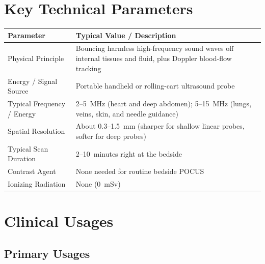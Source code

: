 \section{Key Technical Parameters}

\noindent
\begin{tabularx}{\textwidth}{@{}l X@{}}
\toprule
\textbf{Parameter} & \textbf{Typical Value / Description} \\
\midrule
Physical Principle & Bouncing harmless high-frequency sound waves off internal tissues and fluid, plus Doppler blood-flow tracking \\
Energy / Signal Source & Portable handheld or rolling-cart ultrasound probe \\
Typical Frequency / Energy & 2--5~MHz (heart and deep abdomen); 5--15~MHz (lungs, veins, skin, and needle guidance) \\
Spatial Resolution & About 0.3--1.5~mm (sharper for shallow linear probes, softer for deep probes) \\
Typical Scan Duration & 2--10~minutes right at the bedside \\
Contrast Agent & None needed for routine bedside POCUS \\
Ionizing Radiation & None (0~mSv) \\
\bottomrule
\end{tabularx}

\section{Clinical Usages}

\subsection{Primary Usages}

